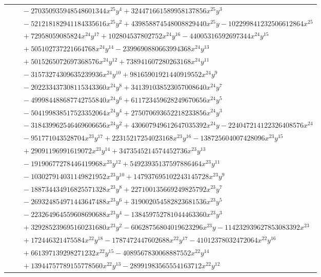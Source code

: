 \documentclass[11pt]{article}
\begin{document}
\begin{longtable}{@{}ll@{}}
 & $\quad -270350935948548601344x^{25}y^{4}+324471661589958137856x^{25}y^{3}$\\
 & $\quad -521218182941184335616x^{25}y^{2}+439858874548008829440x^{25}y-102299841232506612864x^{25}$\\
 & $\quad +72958059085824x^{24}y^{17}+102804537802752x^{24}y^{16}-44005316592697344x^{24}y^{15}$\\
 & $\quad +505102737221664768x^{24}y^{14}-2399690880663994368x^{24}y^{13}$\\
 & $\quad +5015265072697368576x^{24}y^{12}+738941607280263168x^{24}y^{11}$\\
 & $\quad -31573274309635239936x^{24}y^{10}+98165901921440919552x^{24}y^{9}$\\
 & $\quad -202233437308115343360x^{24}y^{8}+341391038523057008640x^{24}y^{7}$\\
 & $\quad -499984488687742755840x^{24}y^{6}+611723459628249670656x^{24}y^{5}$\\
 & $\quad -504199838517523352064x^{24}y^{4}+275070693652218233856x^{24}y^{3}$\\
 & $\quad -318439962546469606656x^{24}y^{2}+430607949612647035392x^{24}y-224047214122326408576x^{24}$\\
 & $\quad -951771043528704x^{23}y^{17}+22315217254023168x^{23}y^{16}-138725604007428096x^{23}y^{15}$\\
 & $\quad +29091196991619072x^{23}y^{14}+3473545214574452736x^{23}y^{13}$\\
 & $\quad -19190677278446419968x^{23}y^{12}+54923935137597886464x^{23}y^{11}$\\
 & $\quad -103027914031149821952x^{23}y^{10}+147937695102243145728x^{23}y^{9}$\\
 & $\quad -188734434916825571328x^{23}y^{8}+227100135669249825792x^{23}y^{7}$\\
 & $\quad -269324854971443647488x^{23}y^{6}+319002054582823681536x^{23}y^{5}$\\
 & $\quad -223264964559608690688x^{23}y^{4}-138459752781044463360x^{23}y^{3}$\\
 & $\quad +329285239695160231680x^{23}y^{2}-60628756804019623296x^{23}y-114232939627853083392x^{23}$\\
 & $\quad +172446321475584x^{22}y^{18}-1787472447602688x^{22}y^{17}-41012378032472064x^{22}y^{16}$\\
 & $\quad +661397139298271232x^{22}y^{15}-4089567830068887552x^{22}y^{14}$\\
 & $\quad +13944757789155778560x^{22}y^{13}-28991983565554163712x^{22}y^{12}$\\

\end{longtable}
\end{document}
